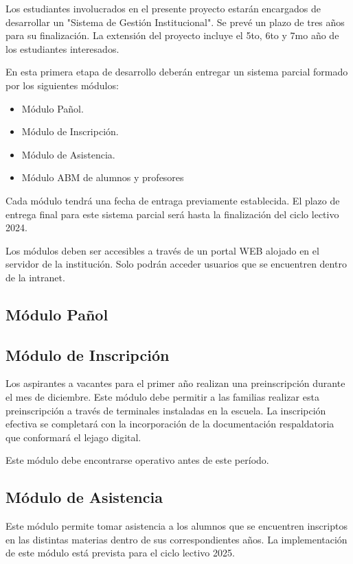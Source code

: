 Los estudiantes involucrados en el presente proyecto estarán encargados de desarrollar un "Sistema de Gestión Institucional". Se prevé un plazo de tres años para su finalización. La extensión del proyecto incluye el 5to, 6to y 7mo año de los estudiantes interesados.

En esta primera etapa de desarrollo deberán entregar un sistema parcial formado por los siguientes módulos:

\begin{itemize}
    \item Módulo Pañol.
    \item Módulo de Inscripción.
    \item Módulo de Asistencia.
    \item Módulo ABM de alumnos y profesores
\end{itemize}

Cada módulo tendrá una fecha de entraga previamente establecida. El plazo de entrega final para este sistema parcial será hasta la finalización del ciclo lectivo 2024.

Los módulos deben ser accesibles a través de un portal WEB alojado en el servidor de la institución. Solo podrán acceder usuarios que se encuentren dentro de la intranet.

\subsection{Módulo Pañol}

\subsection{Módulo de Inscripción}

Los aspirantes a vacantes para el primer año realizan una preinscripción durante el mes de diciembre. Este módulo debe permitir a las familias realizar esta preinscripción a través de terminales instaladas en la escuela. La inscripción efectiva se completará con la incorporación de la documentación respaldatoria que conformará el lejago digital.

Este módulo debe encontrarse operativo antes de este período.

\subsection{Módulo de Asistencia}

Este módulo permite tomar asistencia a los alumnos que se encuentren inscriptos en las distintas materias dentro de sus correspondientes años. La implementación de este módulo está prevista para el ciclo lectivo 2025.

